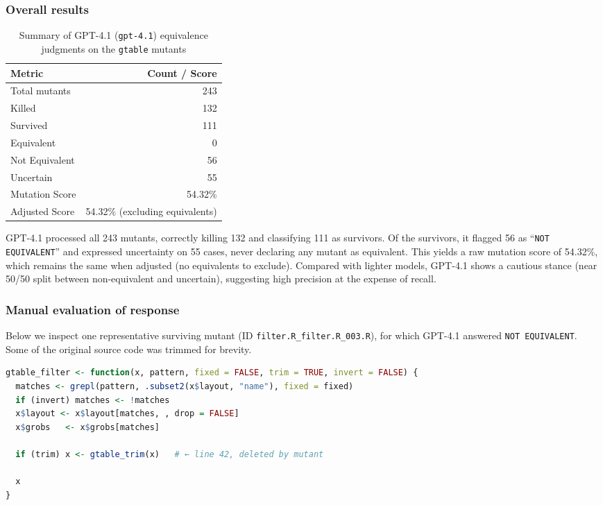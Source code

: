 \subsubsection{Overall results}

\begin{table}[ht]
  \centering
  \begin{tabular}{lr}
    \hline\hline
    \textbf{Metric} & \textbf{Count / Score} \\
    \hline
    Total mutants & 243 \\
    Killed & 132 \\
    Survived & 111 \\
    Equivalent & 0 \\
    Not Equivalent & 56 \\
    Uncertain & 55 \\
    Mutation Score & 54.32\% \\
    Adjusted Score & 54.32\% (excluding equivalents) \\
    \hline
  \end{tabular}
  \caption{Summary of GPT-4.1 (\texttt{gpt-4.1}) equivalence judgments on the \texttt{gtable} mutants}
  \label{tab:gpt41-overall}
\end{table}

GPT-4.1 processed all 243 mutants, correctly killing 132 and classifying 111 as survivors.  Of the survivors, it flagged 56 as “\texttt{NOT EQUIVALENT}” and expressed uncertainty on 55 cases, never declaring any mutant as equivalent.  This yields a raw mutation score of 54.32\%, which remains the same when adjusted (no equivalents to exclude).  Compared with lighter models, GPT-4.1 shows a cautious stance (near 50/50 split between non-equivalent and uncertain), suggesting high precision at the expense of recall.

\subsubsection{Manual evaluation of response}

Below we inspect one representative surviving mutant (ID \texttt{filter.R\_filter.R\_003.R}), for which GPT-4.1 answered \texttt{NOT EQUIVALENT}.  Some of the original source code was trimmed for brevity.

\begin{lstlisting}[language=R, caption={Original \texttt{gtable\_filter} (trimmed)}]
gtable_filter <- function(x, pattern, fixed = FALSE, trim = TRUE, invert = FALSE) {
  matches <- grepl(pattern, .subset2(x$layout, "name"), fixed = fixed)
  if (invert) matches <- !matches
  x$layout <- x$layout[matches, , drop = FALSE]
  x$grobs   <- x$grobs[matches]

  if (trim) x <- gtable_trim(x)   # ← line 42, deleted by mutant

  x
}
\end{lstlisting}

